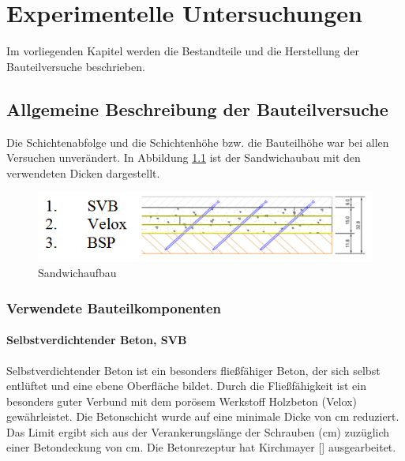 
\chapter{Experimentelle Untersuchungen}


Im vorliegenden Kapitel werden die Bestandteile und die Herstellung der Bauteilversuche beschrieben.



\section{Allgemeine Beschreibung der Bauteilversuche}


Die Schichtenabfolge und die Schichtenhöhe bzw. die Bauteilhöhe war bei allen Versuchen unverändert. In Abbildung \ref{sandwichaufbau} ist der Sandwichaubau  mit den verwendeten Dicken dargestellt.

\begin{figure}[h]
\begin{center}
\includegraphics[scale =0.9]{Aufbau/bauteile/sandwich.png}
\caption{Sandwichaufbau}
\label{sandwichaufbau}
\end{center}
\end{figure}



\subsection{Verwendete Bauteilkomponenten}
\subsubsection{Selbstverdichtender Beton, SVB}

Selbstverdichtender Beton ist ein besonders fließfähiger Beton, der sich selbst entlüftet und eine ebene Oberfläche bildet. Durch die Fließfähigkeit ist ein besonders guter Verbund mit dem porösem Werkstoff Holzbeton (Velox) gewährleistet. Die Betonschicht wurde auf eine minimale Dicke von \unit[6]{cm} reduziert. Das Limit ergibt sich aus der Verankerungslänge der Schrauben (\unit[4]{cm}) zuzüglich einer Betondeckung von \unit[2]{cm}. Die Betonrezeptur hat Kirchmayer [] ausgearbeitet.


